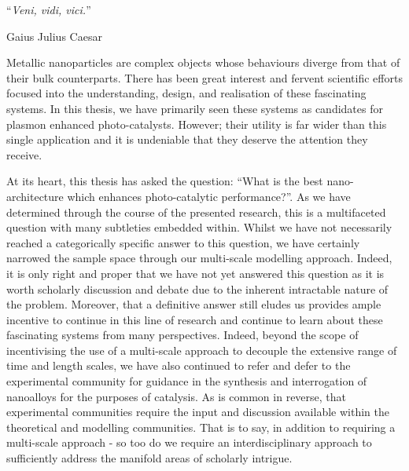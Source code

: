 \noindent\enquote{\itshape Veni, vidi, vici.}\bigbreak

\hfill Gaius Julius Caesar

\vspace*{0.05\textheight}

Metallic nanoparticles are complex objects whose behaviours diverge from that of their bulk counterparts. There has been great interest and fervent scientific efforts focused into the understanding, design, and realisation of these fascinating systems. In this thesis, we have primarily seen these systems as candidates for plasmon enhanced photo-catalysts. However; their utility is far wider than this single application and it is undeniable that they deserve the attention they receive.

At its heart, this thesis has asked the question: ``What is the best nano-architecture which enhances photo-catalytic performance?''. As we have determined through the course of the presented research, this is a multifaceted question with many subtleties embedded within. Whilst we have not necessarily reached a categorically specific answer to this question, we have certainly narrowed the sample space through our multi-scale modelling approach. Indeed, it is only right and proper that we have not yet answered this question as it is worth scholarly discussion and debate due to the inherent intractable nature of the problem. Moreover, that a definitive answer still eludes us provides ample incentive to continue in this line of research and continue to learn about these fascinating systems from many perspectives. Indeed, beyond the scope of incentivising the use of a multi-scale approach to decouple the extensive range of time and length scales, we have also continued to refer and defer to the experimental community for guidance in the synthesis and interrogation of nanoalloys for the purposes of catalysis. As is common in reverse, that experimental communities require the input and discussion available within the theoretical and modelling communities. That is to say, in addition to requiring a multi-scale approach - so too do we require an interdisciplinary approach to sufficiently address the manifold areas of scholarly intrigue.

